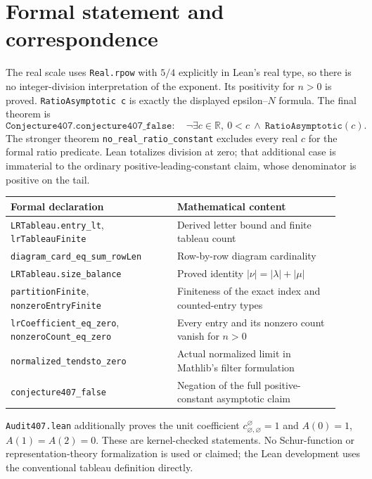 \documentclass[11pt]{article}
\newcommand{\R}{\mathbb R}
\begin{document}
\section{Formal statement and correspondence}
The real scale uses \texttt{Real.rpow} with $5/4$ explicitly in Lean's real
type, so there is no integer-division interpretation of the exponent. Its positivity for $n>0$ is proved.
\texttt{RatioAsymptotic c} is exactly the displayed epsilon--$N$ formula.
The final theorem is
\[
 \texttt{Conjecture407.conjecture407\_false}:\quad
 \neg\exists c\in\R,\ 0<c\ \land\ \texttt{RatioAsymptotic}(c).
\]
The stronger theorem \texttt{no\_real\_ratio\_constant} excludes every real
$c$ for the formal ratio predicate. Lean totalizes division at zero; that
additional case is immaterial to the ordinary positive-leading-constant
claim, whose denominator is positive on the tail.

\begin{center}\small
\begin{tabular}{@{}p{0.47\linewidth}p{0.46\linewidth}@{}}
\toprule
Formal declaration & Mathematical content\\
\midrule
\texttt{LRTableau.entry\_lt}, \texttt{lrTableauFinite}
 & Derived letter bound and finite tableau count\\
\texttt{diagram\_card\_eq\_sum\_rowLen}
 & Row-by-row diagram cardinality\\
\texttt{LRTableau.size\_balance}
 & Proved identity $|\nu|=|\lambda|+|\mu|$\\
\texttt{partitionFinite}, \texttt{nonzeroEntryFinite}
 & Finiteness of the exact index and counted-entry types\\
\texttt{lrCoefficient\_eq\_zero}, \texttt{nonzeroCount\_eq\_zero}
 & Every entry and its nonzero count vanish for $n>0$\\
\texttt{normalized\_tendsto\_zero}
 & Actual normalized limit in Mathlib's filter formulation\\
\texttt{conjecture407\_false}
 & Negation of the full positive-constant asymptotic claim\\
\bottomrule
\end{tabular}
\end{center}
\texttt{Audit407.lean} additionally proves the unit coefficient
$c^{\varnothing}_{\varnothing,\varnothing}=1$ and $A(0)=1$, $A(1)=A(2)=0$.
These are kernel-checked statements. No Schur-function or representation-theory
formalization is used or claimed; the Lean development uses the conventional
tableau definition directly.
\end{document}
